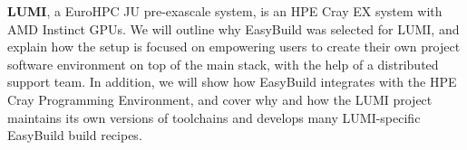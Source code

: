 \textbf{LUMI}, a EuroHPC JU pre-exascale system, is an HPE Cray EX system with AMD Instinct GPUs.
We will outline why EasyBuild was selected for LUMI, and explain how
the setup is focused on empowering users to create their own project software environment on top of the main stack,
with the help of a distributed support team. In addition, we will show how EasyBuild
integrates with the HPE Cray Programming Environment, and cover why and how the LUMI project maintains
its own versions of toolchains and develops many LUMI-specific EasyBuild build recipes.






